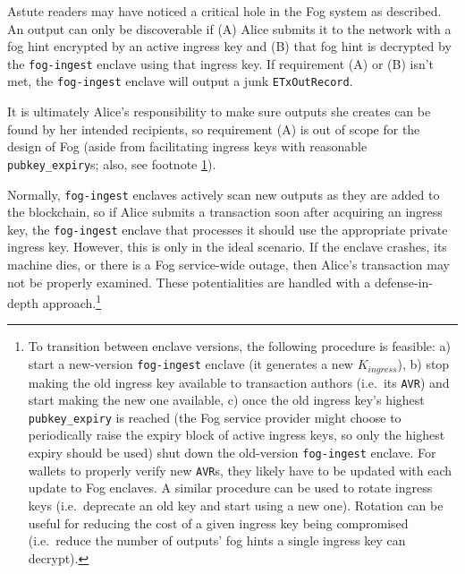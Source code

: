 Astute readers may have noticed a critical hole in the Fog system as described. An output can only be discoverable if (A) Alice submits it to the network with a fog hint encrypted by an active ingress key and (B) that fog hint is decrypted by the {\tt fog-ingest} enclave using that ingress key. If requirement (A) or (B) isn't met, the {\tt fog-ingest} enclave will output a junk {\tt ETxOutRecord}.

It is ultimately Alice's responsibility to make sure outputs she creates can be found by her intended recipients, so requirement (A) is out of scope for the design of Fog (aside from facilitating ingress keys with reasonable {\tt pubkey\_expiry}s; also, see footnote \ref{footnote:fog-ingest-enclave-version-transition}).

Normally, {\tt fog-ingest} enclaves actively scan new outputs as they are added to the blockchain, so if Alice submits a transaction soon after acquiring an ingress key, the {\tt fog-ingest} enclave that processes it should use the appropriate private ingress key. However, this is only in the ideal scenario. If the enclave crashes, its machine dies, or there is a Fog service-wide outage, then Alice's transaction may not be properly examined. These potentialities are handled with a defense-in-depth approach.\footnote{\label{footnote:fog-ingest-enclave-version-transition}To transition between enclave versions, the following procedure is feasible: a) start a new-version {\tt fog-ingest} enclave (it generates a new $K_{ingress}$), b) stop making the old ingress key available to transaction authors (i.e.\ its {\tt AVR}) and start making the new one available, c) once the old ingress key's highest {\tt pubkey\_expiry} is reached (the Fog service provider might choose to periodically raise the expiry block of active ingress keys, so only the highest expiry should be used) shut down the old-version {\tt fog-ingest} enclave. For wallets to properly verify new {\tt AVR}s, they likely have to be updated with each update to Fog enclaves. A similar procedure can be used to rotate ingress keys (i.e.\ deprecate an old key and start using a new one). Rotation can be useful for reducing the cost of a given ingress key being compromised (i.e.\ reduce the number of outputs' fog hints a single ingress key can decrypt).}

